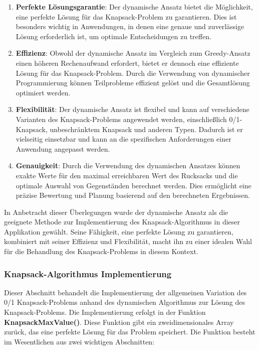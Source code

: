 \begin{enumerate}
    \item \textbf{Perfekte Lösungsgarantie}: Der dynamische Ansatz bietet die Möglichkeit, eine perfekte Lösung für das
    Knapsack-Problem zu garantieren. Dies ist besonders wichtig in Anwendungen, in denen eine genaue und zuverlässige
    Lösung erforderlich ist, um optimale Entscheidungen zu treffen.
    \item \textbf{Effizienz}: Obwohl der dynamische Ansatz im Vergleich zum Greedy-Ansatz einen höheren Rechenaufwand
    erfordert, bietet er dennoch eine effiziente Lösung für das Knapsack-Problem. Durch die Verwendung von dynamischer
    Programmierung können Teilprobleme effizient gelöst und die Gesamtlösung optimiert werden.
    \item \textbf{Flexibilität}: Der dynamische Ansatz ist flexibel und kann auf verschiedene Varianten des Knapsack-Problems
    angewendet werden, einschließlich 0/1-Knapsack, unbeschränktem Knapsack und anderen Typen. Dadurch ist er vielseitig
    einsetzbar und kann an die spezifischen Anforderungen einer Anwendung angepasst werden.
    \item \textbf{Genauigkeit}: Durch die Verwendung des dynamischen Ansatzes können exakte Werte für den maximal erreichbaren
    Wert des Rucksacks und die optimale Auswahl von Gegenständen berechnet werden. Dies ermöglicht eine präzise Bewertung
    und Planung basierend auf den berechneten Ergebnissen.
\end{enumerate}

In Anbetracht dieser Überlegungen wurde der dynamische Ansatz als die geeignete Methode zur Implementierung des Knapsack-Algorithmus
in dieser Applikation gewählt. Seine Fähigkeit, eine perfekte Lösung zu garantieren, kombiniert mit seiner Effizienz und
Flexibilität, macht ihn zu einer idealen Wahl für die Behandlung des Knapsack-Problems in diesem Kontext.

\subsubsection{Knapsack-Algorithmus Implementierung}
Dieser Abschnitt behandelt die Implementierung der allgemeinen Variation des 0/1 Knapsack-Problems anhand des dynamischen
Algorithmus zur Lösung des Knapsack-Problems. Die Implementierung erfolgt in der Funktion \textbf{KnapsackMaxValue()}.
Diese Funktion gibt ein zweidimensionales Array zurück, das eine perfekte Lösung für das Problem speichert. Die Funktion
besteht im Wesentlichen aus zwei wichtigen Abschnitten:

